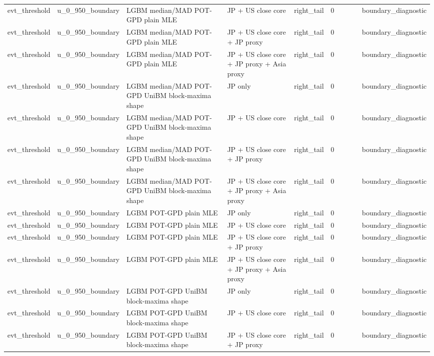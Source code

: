 \begin{tabular}{lll l lrrrrl}
evt\_threshold & u\_0\_950\_boundary & LGBM median/MAD POT-GPD plain MLE & JP + US close core & right\_tail & 0 &  &  &  & boundary\_diagnostic \\
evt\_threshold & u\_0\_950\_boundary & LGBM median/MAD POT-GPD plain MLE & JP + US close core + JP proxy & right\_tail & 0 &  &  &  & boundary\_diagnostic \\
evt\_threshold & u\_0\_950\_boundary & LGBM median/MAD POT-GPD plain MLE & JP + US close core + JP proxy + Asia proxy & right\_tail & 0 &  &  &  & boundary\_diagnostic \\
evt\_threshold & u\_0\_950\_boundary & LGBM median/MAD POT-GPD UniBM block-maxima shape & JP only & right\_tail & 0 &  &  &  & boundary\_diagnostic \\
evt\_threshold & u\_0\_950\_boundary & LGBM median/MAD POT-GPD UniBM block-maxima shape & JP + US close core & right\_tail & 0 &  &  &  & boundary\_diagnostic \\
evt\_threshold & u\_0\_950\_boundary & LGBM median/MAD POT-GPD UniBM block-maxima shape & JP + US close core + JP proxy & right\_tail & 0 &  &  &  & boundary\_diagnostic \\
evt\_threshold & u\_0\_950\_boundary & LGBM median/MAD POT-GPD UniBM block-maxima shape & JP + US close core + JP proxy + Asia proxy & right\_tail & 0 &  &  &  & boundary\_diagnostic \\
evt\_threshold & u\_0\_950\_boundary & LGBM POT-GPD plain MLE & JP only & right\_tail & 0 &  &  &  & boundary\_diagnostic \\
evt\_threshold & u\_0\_950\_boundary & LGBM POT-GPD plain MLE & JP + US close core & right\_tail & 0 &  &  &  & boundary\_diagnostic \\
evt\_threshold & u\_0\_950\_boundary & LGBM POT-GPD plain MLE & JP + US close core + JP proxy & right\_tail & 0 &  &  &  & boundary\_diagnostic \\
evt\_threshold & u\_0\_950\_boundary & LGBM POT-GPD plain MLE & JP + US close core + JP proxy + Asia proxy & right\_tail & 0 &  &  &  & boundary\_diagnostic \\
evt\_threshold & u\_0\_950\_boundary & LGBM POT-GPD UniBM block-maxima shape & JP only & right\_tail & 0 &  &  &  & boundary\_diagnostic \\
evt\_threshold & u\_0\_950\_boundary & LGBM POT-GPD UniBM block-maxima shape & JP + US close core & right\_tail & 0 &  &  &  & boundary\_diagnostic \\
evt\_threshold & u\_0\_950\_boundary & LGBM POT-GPD UniBM block-maxima shape & JP + US close core + JP proxy & right\_tail & 0 &  &  &  & boundary\_diagnostic \\

\end{tabular}
